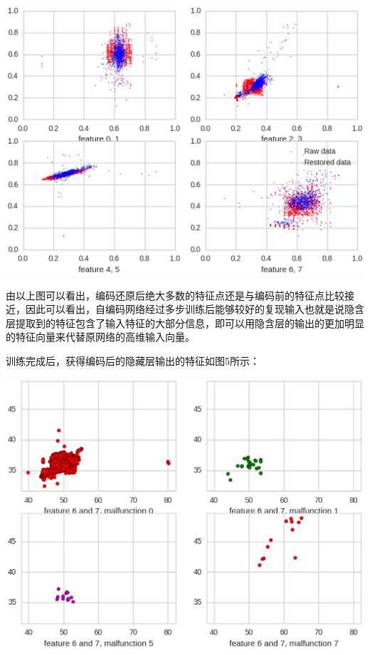 \documentclass{ctacn}%
\begin{document}
\begin{multicols}{2}
\begin{center}
	\includegraphics[scale=0.4, trim=0 0 0 0]{figs/autoencoder_restore}\\
	\label{fig5}
\end{center}

由以上图可以看出，编码还原后绝大多数的特征点还是与编码前的特征点比较接近，因此可以看出，自编码网络经过多步训练后能够较好的复现输入也就是说隐含层提取到的特征包含了输入特征的大部分信息，即可以用隐含层的输出的更加明显的特征向量来代替原网络的高维输入向量。

训练完成后，获得编码后的隐藏层输出的特征如图5所示：

\begin{center}
	\includegraphics[scale=0.4, trim=0 0 0 0]{figs/autoencoder_encoded_features}\\
	\label{fig6}
\end{center}


\end{multicols}
\end{document}
